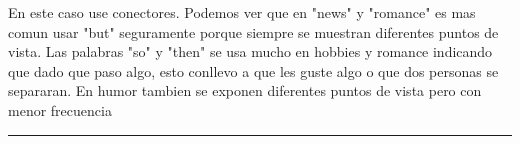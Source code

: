 \documentclass[11pt]{article}
\begin{document}
    En este caso use conectores. Podemos ver que en "news" y "romance" es
mas comun usar "but" seguramente porque siempre se muestran diferentes
puntos de vista. Las palabras "so" y "then" se usa mucho en hobbies y
romance indicando que dado que paso algo, esto conllevo a que les guste
algo o que dos personas se separaran. En humor tambien se exponen
diferentes puntos de vista pero con menor frecuencia

    \begin{center}\rule{0.5\linewidth}{\linethickness}\end{center}


    
    
    
    
\end{document}
